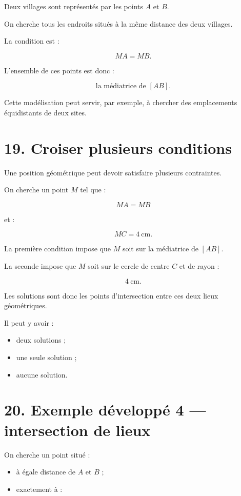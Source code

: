 Deux villages sont représentés par les points $A$ et $B$.

On cherche tous les endroits situés à la même distance des deux villages.

La condition est :

\[
MA=MB.
\]

L’ensemble de ces points est donc :

\[
\boxed{\text{la médiatrice de }[AB]}.
\]

Cette modélisation peut servir, par exemple, à chercher des emplacements équidistants de deux sites.

\section{19. Croiser plusieurs conditions}

Une position géométrique peut devoir satisfaire plusieurs contraintes.

On cherche un point $M$ tel que :

\[
MA=MB
\]

et :

\[
MC=4\ \text{cm}.
\]

La première condition impose que $M$ soit sur la médiatrice de $[AB]$.

La seconde impose que $M$ soit sur le cercle de centre $C$ et de rayon :

\[
4\ \text{cm}.
\]

Les solutions sont donc les points d’intersection entre ces deux lieux géométriques.

Il peut y avoir :

\begin{itemize}
\item deux solutions ;
\item une seule solution ;
\item aucune solution.
\end{itemize}

\section{20. Exemple développé 4 — intersection de lieux}

On cherche un point situé :

\begin{itemize}
\item à égale distance de $A$ et $B$ ;
\item exactement à :
\end{itemize}

